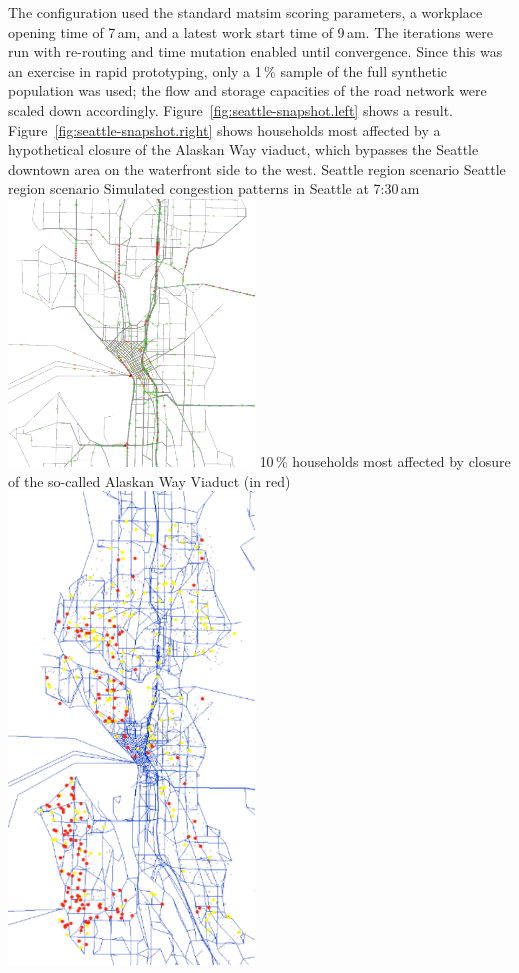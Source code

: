 The configuration used the standard \gls{matsim} scoring parameters, a workplace opening time of 7\,am, and a latest work start time of 9\,am. The iterations were run with re-routing and time mutation enabled until convergence. Since this was an exercise in rapid prototyping, only a 1\,\% sample of the full synthetic population was used; the flow and storage capacities of the road network were scaled down accordingly. Figure~\ref{fig:seattle-snapshot.left} shows a result. Figure~\ref{fig:seattle-snapshot.right} shows households most affected by a hypothetical closure of the Alaskan Way viaduct, which bypasses the Seattle downtown area on the waterfront side to the west.
%
\createfigure%
{Seattle region scenario}%
{Seattle region scenario}%
{\label{fig:seattle-snapshot}}%
{%
  \createsubfigure%
  {Simulated congestion patterns in Seattle at 7:30\,am}%
  {\includegraphics[width=0.49\textwidth,angle=0]{using/figures/seattle-snapshot-7h30.pdf}}%
  {\label{fig:seattle-snapshot.left}}%
  {}%
  \createsubfigure%
  {10\,\% households most affected by closure of the so-called Alaskan Way Viaduct (in red)}%
	{\includegraphics[width=0.49\textwidth,angle=0]{using/figures/seattle-top-10pct-0it.pdf}}%
  {\label{fig:seattle-snapshot.right}}%
  {}%
}%
{}



